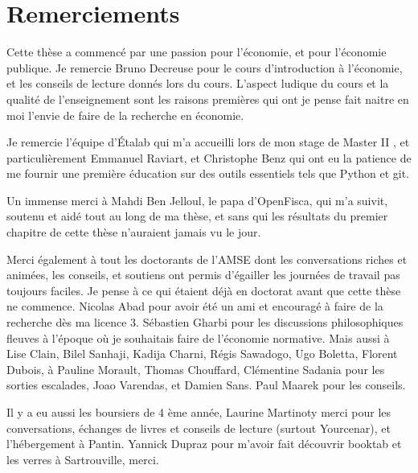 
\ifx\isEmbedded\undefined





\else \fi


\chapter*{Remerciements}



Cette thèse a commencé par une passion pour l’économie, et pour l’économie publique. Je remercie Bruno Decreuse pour le cours d’introduction à l’économie, et les conseils de lecture donnés lors du cours. L’aspect ludique du cours et la qualité de l’enseignement sont les raisons premières qui ont je pense fait naitre en moi l’envie de faire de la recherche en économie. 


\medskip


Je  remercie l’équipe d’Étalab qui m’a accueilli lors de mon stage de Master II , et particulièrement Emmanuel Raviart, et Christophe Benz qui ont eu la patience de me fournir une première éducation sur des outils essentiels tels que Python et git. 


Un immense merci à Mahdi Ben Jelloul, le papa d’OpenFisca, qui m’a suivit, soutenu et aidé tout au long de ma thèse,  et sans qui les résultats du premier chapitre de cette thèse n’auraient jamais vu le jour.


\medskip
Merci également à tout les doctorants de l’AMSE dont les conversations riches et animées,  les conseils, et soutiens ont permis d’égailler les journées de travail pas toujours faciles. 
Je pense à ce qui étaient déjà en doctorat avant que cette thèse ne commence. Nicolas Abad pour avoir été un ami et encouragé à faire de la recherche dès ma licence 3. Sébastien Gharbi pour les discussions philosophiques fleuves à l’époque où je souhaitais faire de l’économie normative. Mais aussi à Lise Clain, Bilel Sanhaji, Kadija Charni, Régis Sawadogo, Ugo Boletta, Florent Dubois, à Pauline Morault, Thomas Chouffard, Clémentine Sadania pour les sorties escalades, Joao Varendas, et Damien Sans. Paul Maarek pour les conseils.


Il y a eu aussi les boursiers de 4 ème année, Laurine Martinoty merci pour les conversations, échanges de livres et conseils de lecture (surtout Yourcenar), et l’hébergement à Pantin. Yannick Dupraz pour m’avoir fait découvrir booktab et les verres à Sartrouville, merci.


